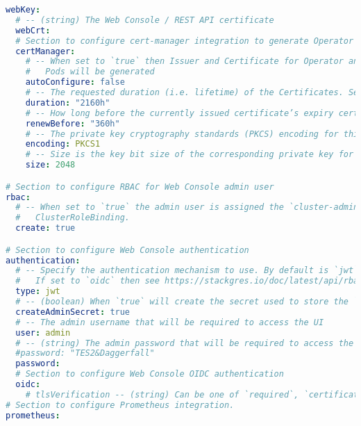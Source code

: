 \begin{lstlisting}[language=yaml, caption=StackGres-Citus - Helm Chart Manifest,captionpos=b,label={lst:stackgres_citus-values.yaml},breaklines=true]
  webKey:
  # -- (string) The Web Console / REST API certificate
  webCrt:
  # Section to configure cert-manager integration to generate Operator certificates
  certManager:
    # -- When set to `true` then Issuer and Certificate for Operator and Web Console / REST API
    #   Pods will be generated
    autoConfigure: false
    # -- The requested duration (i.e. lifetime) of the Certificates. See https://cert-manager.io/docs/reference/api-docs/#cert-manager.io%2fv1
    duration: "2160h"
    # -- How long before the currently issued certificate’s expiry cert-manager should renew the certificate. See https://cert-manager.io/docs/reference/api-docs/#cert-manager.io%2fv1
    renewBefore: "360h"
    # -- The private key cryptography standards (PKCS) encoding for this certificate’s private key to be encoded in. See https://cert-manager.io/docs/reference/api-docs/#cert-manager.io/v1.CertificatePrivateKey
    encoding: PKCS1
    # -- Size is the key bit size of the corresponding private key for this certificate. See https://cert-manager.io/docs/reference/api-docs/#cert-manager.io/v1.CertificatePrivateKey
    size: 2048

# Section to configure RBAC for Web Console admin user
rbac:
  # -- When set to `true` the admin user is assigned the `cluster-admin` ClusterRole by creating
  #   ClusterRoleBinding.
  create: true

# Section to configure Web Console authentication
authentication:
  # -- Specify the authentication mechanism to use. By default is `jwt`, see https://stackgres.io/doc/latest/api/rbac#local-secret-mechanism.
  #   If set to `oidc` then see https://stackgres.io/doc/latest/api/rbac/#openid-connect-provider-mechanism.
  type: jwt
  # -- (boolean) When `true` will create the secret used to store the `admin` user credentials to access the UI.
  createAdminSecret: true
  # -- The admin username that will be required to access the UI
  user: admin
  # -- (string) The admin password that will be required to access the UI
  #password: "TES2&Daggerfall"
  password:
  # Section to configure Web Console OIDC authentication
  oidc:
    # tlsVerification -- (string) Can be one of `required`, `certificate-validation` or `none`
# Section to configure Prometheus integration.
prometheus:


\end{lstlisting}
